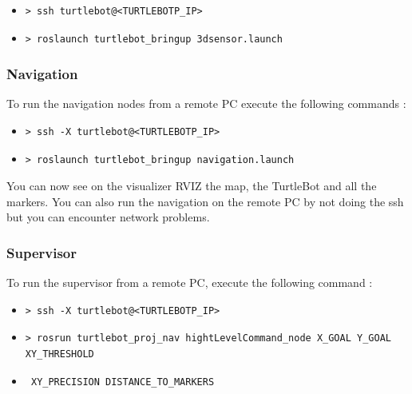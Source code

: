 \documentclass[10pt,a4paper]{article}
\begin{document}
\begin{itemize}
\item[]  \begin{verbatim}> ssh turtlebot@<TURTLEBOTP_IP> \end{verbatim}
\item[]  \begin{verbatim}> roslaunch turtlebot_bringup 3dsensor.launch \end{verbatim}
\end{itemize}

\subsubsection{Navigation}

To run the navigation nodes from a remote PC execute the following commands :

\begin{itemize}
\item[]  \begin{verbatim}> ssh -X turtlebot@<TURTLEBOTP_IP> \end{verbatim}
\item[]  \begin{verbatim}> roslaunch turtlebot_bringup navigation.launch \end{verbatim}
\end{itemize}

You can now see on the visualizer RVIZ the map, the TurtleBot and all the markers. You can also run the navigation on the remote PC by not doing the ssh but you can encounter network problems.

\subsubsection{Supervisor}

To run the supervisor from a remote PC, execute the following command :

\begin{itemize}
\item[]  \begin{verbatim}> ssh -X turtlebot@<TURTLEBOTP_IP> \end{verbatim}
\item[]  \begin{verbatim}> rosrun turtlebot_proj_nav hightLevelCommand_node X_GOAL Y_GOAL XY_THRESHOLD  \end{verbatim}
\item[]  \begin{verbatim} XY_PRECISION DISTANCE_TO_MARKERS \end{verbatim}
\end{itemize}
\end{document}
